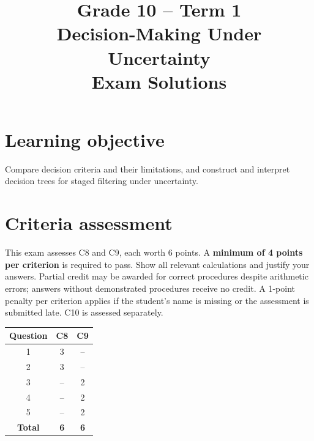 \makeatletter
{}
\makeatother

\title{Grade 10 -- Term 1\\Decision-Making Under Uncertainty\\Exam Solutions}
\author{}\date{}

\maketitle
\setcounter{tocdepth}{1}\setcounter{secnumdepth}{2}
\label{toc}\tableofcontents
\section*{Learning objective}
Compare decision criteria and their limitations, and construct and interpret decision trees for staged filtering under uncertainty.
\section*{Criteria assessment}
This exam assesses C8 and C9, each worth 6 points. A \textbf{minimum of 4 points per criterion} is required to pass. Show all relevant calculations and justify your answers. Partial credit may be awarded for correct procedures despite arithmetic errors; answers without demonstrated procedures receive no credit. A 1-point penalty per criterion applies if the student's name is missing or the assessment is submitted late. C10 is assessed separately.
\begin{center}
\begin{tabular}{|c|c|c|}
				\hline
				\textbf{Question} & \textbf{C8} & \textbf{C9} \\ \hline
				1 & 3 & -- \\ \hline
				2 & 3 & -- \\ \hline
				3 & -- & 2 \\ \hline
				4 & -- & 2 \\ \hline
				5 & -- & 2 \\ \hline
				\textbf{Total} & \textbf{6} & \textbf{6} \\ \hline
			\end{tabular}
\end{center}
